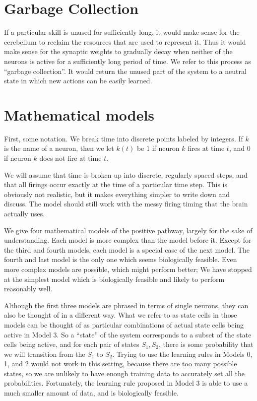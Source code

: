 \documentclass{article}
\theoremstyle{definition}
\begin{document}
\section{Garbage Collection}

If a particular skill is unused for sufficiently long, it would make
sense for the cerebellum to reclaim the resources that are used to
represent it. Thus it would make sense for the synaptic weights to
gradually decay when neither of the neurons is active for a
sufficiently long period of time. We refer to this process as
``garbage collection''. It would return the unused part of the system
to a neutral state in which new actions can be easily learned.

\section{Mathematical models}

First, some notation. We break time into discrete points labeled by
integers. If $k$ is the name of a neuron, then we let $k(t)$ be $1$ if
neuron $k$ fires at time $t$, and $0$ if neuron $k$ does not fire at
time $t$.

We will assume that time is broken up into discrete, regularly spaced
steps, and that all firings occur exactly at the time of a particular
time step. This is obviously not realistic, but it makes everything
simpler to write down and discuss. The model should still work with
the messy firing timing that the brain actually uses.

We give four mathematical models of the positive pathway, largely for
the sake of understanding. Each model is more complex than the model
before it. Except for the third and fourth models, each model is a
special case of the next model. The fourth and last model is the only
one which seems biologically feasible. Even more complex models are
possible, which might perform better; We have stopped at the simplest
model which is biologically feasible and likely to perform reasonably
well.

Although the first three models are phrased in terms of single
neurons, they can also be thought of in a different way. What we refer
to as state cells in those models can be thought of as particular
combinations of actual state cells being active in Model 3. So a
``state'' of the system corresponds to a subset of the state cells
being active, and for each pair of states $S_1, S_2$, there is some
probability that we will transition from the $S_1$ to $S_2$. Trying to
use the learning rules in Models 0, 1, and 2 would not work in this
setting, because there are too many possible states, so we are
unlikely to have enough training data to accurately set all the
probabilities. Fortunately, the learning rule proposed in Model 3 is
able to use a much smaller amount of data, and is biologically
feasible.
\end{document}
